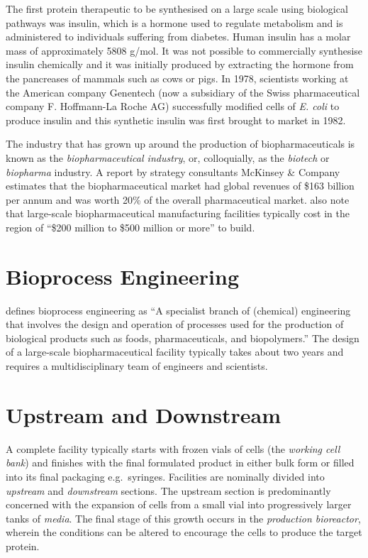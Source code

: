 The first protein therapeutic to be synthesised on a large scale using 
biological pathways was insulin, which is a hormone used to regulate metabolism
and is administered to individuals suffering from diabetes.
Human insulin has a molar mass of approximately 5808 g/mol.
It was not possible to commercially synthesise insulin chemically and it was
initially produced by extracting the hormone from the pancreases of mammals
such as cows or pigs.
In 1978, scientists working at  the American company Genentech (now a
subsidiary of the Swiss pharmaceutical company F. Hoffmann-La Roche AG)
successfully modified cells of \textit{E. coli} to produce insulin and this
synthetic insulin was first brought to market in 1982.

The industry that has grown up around the production of biopharmaceuticals is 
known as the \emph{biopharmaceutical industry}, or, colloquially, as the
\emph{biotech} or \emph{biopharma} industry.
A report by strategy consultants McKinsey \& Company \citep{Otto:2014}
estimates that the biopharmaceutical market had global revenues of
\$163 billion per annum and was worth 20\% of the overall pharmaceutical
market.
\citet{Otto:2014} also note that large-scale biopharmaceutical manufacturing
facilities typically cost in the region of 
``\$200 million to \$500 million or more'' to build.

\section{Bioprocess Engineering}\label{SS.bioproceng}

\citet{Schaschke:2014} defines bioprocess engineering as ``A specialist branch
of (chemical) engineering that involves the design and operation of processes
used for the production of biological products such as foods, pharmaceuticals,
and biopolymers.''  
The design of a large-scale biopharmaceutical facility typically takes about
two years and requires a multidisciplinary team of engineers and scientists.

\section{Upstream and Downstream}\label{SS.updown}

A complete facility typically starts with frozen vials of cells (the 
\emph{working cell bank}) and finishes with the final formulated product in
either bulk form or filled into its final packaging e.g.\ syringes.
Facilities are nominally divided into \emph{upstream} and \emph{downstream} 
sections.
The upstream section is predominantly concerned with the expansion of cells
from a small vial into progressively larger tanks of \emph{media}.  
The final stage of this growth occurs in the \emph{production bioreactor}, 
wherein the conditions can be altered to encourage the cells to produce the 
target protein.

